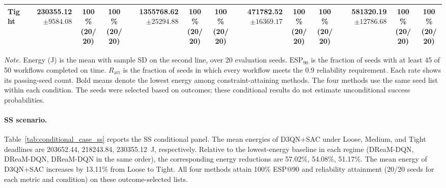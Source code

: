 \begin{table}[!t]
\begin{tabular}{@{}l*{4}{rcc}@{}}
Tight & \shortstack[r]{\textbf{230355.12}\\$\pm 9584.08$} & \shortstack[c]{100\%\\(20/20)} & \shortstack[c]{100\%\\(20/20)} & \shortstack[r]{1355768.62\\$\pm 25294.88$} & \shortstack[c]{100\%\\(20/20)} & \shortstack[c]{100\%\\(20/20)} & \shortstack[r]{471782.52\\$\pm 16369.17$} & \shortstack[c]{100\%\\(20/20)} & \shortstack[c]{100\%\\(20/20)} & \shortstack[r]{581320.19\\$\pm 12786.68$} & \shortstack[c]{100\%\\(20/20)} & \shortstack[c]{100\%\\(20/20)} \\
\bottomrule
\end{tabular}
\par\vspace{3pt}
\parbox{\textwidth}{\footnotesize
\textit{Note.} Energy (J) is the mean with sample SD on the second line, over 20 evaluation seeds.
$\mathrm{ESP}_{90}$ is the fraction of seeds with at least 45 of 50 workflows completed on time.
$R_{\mathrm{att}}$ is the fraction of seeds in which every workflow meets the 0.9 reliability requirement.
Each rate shows its passing-seed count. Bold means denote the lowest energy among constraint-attaining methods.
The four methods use the same seed list within each condition.
The seeds were selected based on outcomes; these conditional results do not estimate unconditional success probabilities.}
\endgroup
\end{table}

\paragraph{SS scenario.}
Table~\ref{tab:conditional_case_ss} reports the SS conditional panel. The mean energies of D3QN+SAC under Loose, Medium, and Tight deadlines are 203652.44, 218243.84, 230355.12~J, respectively. Relative to the lowest-energy baseline in each regime (DReaM-DQN, DReaM-DQN, DReaM-DQN in the same order), the corresponding energy reductions are 57.02\%, 54.08\%, 51.17\%. The mean energy of D3QN+SAC increases by 13.11\% from Loose to Tight. All four methods attain 100\% ESP@90 and reliability attainment (20/20 seeds for each metric and condition) on these outcome-selected lists.

